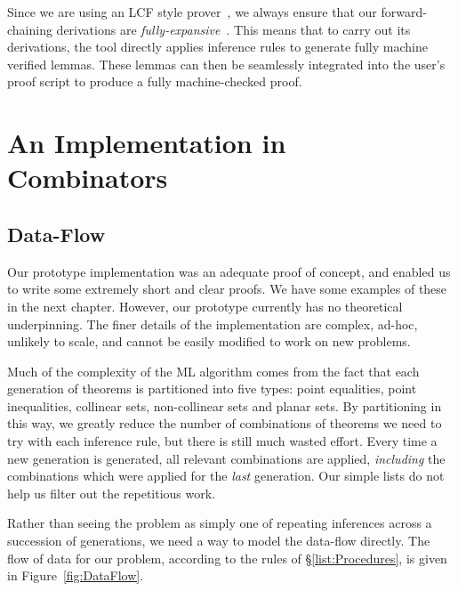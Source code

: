 Since we are using an LCF style prover~\cite{LCF}, we always ensure that our forward-chaining derivations are \emph{fully-expansive}~\cite{FullyExpansive}. This means that to carry out its derivations, the tool directly applies inference rules to generate fully machine verified lemmas. These lemmas can then be seamlessly integrated into the user's proof script to produce a fully machine-checked proof.

\section{An Implementation in Combinators}\label{sec:DiscoveryAlgebra}
\subsection{Data-Flow}
Our prototype implementation was an adequate proof of concept, and enabled us to write some extremely short and clear proofs. We have some examples of these in the next chapter. However, our prototype currently has no theoretical underpinning. The finer details of the implementation are complex, ad-hoc, unlikely to scale, and cannot be easily modified to work on new problems.

Much of the complexity of the ML algorithm comes from the fact that each generation of theorems is partitioned into five types: point equalities, point inequalities, collinear sets, non-collinear sets and planar sets. By partitioning in this way, we greatly reduce the number of combinations of theorems we need to try with each inference rule, but there is still much wasted effort. Every time a new generation is generated, all relevant combinations are applied, \emph{including} the combinations which were applied for the \emph{last} generation. Our simple lists do not help us filter out the repetitious work.

Rather than seeing the problem as simply one of repeating inferences across a succession of generations, we need a way to model the data-flow directly. The flow of data for our problem, according to the rules of \S\ref{list:Procedures}, is given in Figure~\ref{fig:DataFlow}.

